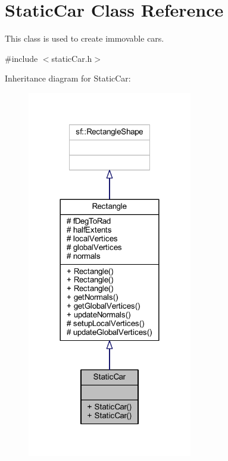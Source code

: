 \hypertarget{class_static_car}{}\section{Static\+Car Class Reference}
\label{class_static_car}


This class is used to create immovable cars.  




{\ttfamily \#include $<$static\+Car.\+h$>$}



Inheritance diagram for Static\+Car\+:\nopagebreak
\begin{figure}[H]
\begin{center}
\leavevmode
\includegraphics[width=204pt]{class_static_car__inherit__graph}
\end{center}
\end{figure}


